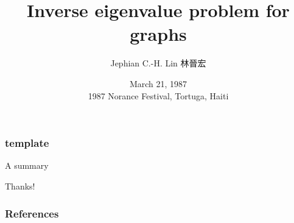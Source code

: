 \documentclass{beamer}
\title[Inverse eigenvalue problem for graphs \hspace{7em} \insertframenumber/\inserttotalframenumber]{Inverse eigenvalue problem for graphs}
\author[Jephian C.-H. Lin]{Jephian C.-H. Lin 林晉宏}
\institute[NSYSU]{Department of Applied Mathematics, National Sun Yat-sen University}
\date[March 21, 1987]{March 21, 1987\\
1987 Norance Festival,
Tortuga, Haiti}
\theoremstyle{definition}
\begin{document}
\begin{CJK}{UTF8}{bkai}
\maketitle
\end{CJK}


\begin{frame}
\frametitle{template}

\end{frame}


\begin{frame}

\begin{center}
A summary
\end{center}

\pause


\begin{flushright}
{\Large\color{Tortuga} Thanks!}
\end{flushright}

\end{frame}


\begin{frame}[allowframebreaks]
\frametitle{References}
{}

\end{frame}



\end{document}
